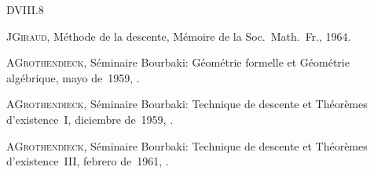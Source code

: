 \begin{sgabibliography}{D}{VIII.8}

 J\ptbl \textsc{Giraud}, Méthode de la descente, Mémoire 
de la Soc.\ Math.\ Fr., 1964.

 A\ptbl \textsc{Grothendieck}, Séminaire Bourbaki:
Géométrie formelle et Géométrie algébrique, mayo de~1959, .

 A\ptbl \textsc{Grothendieck}, Séminaire Bourbaki: Technique de
descente et Théorèmes d'existence~I, diciembre de~1959, .

 A\ptbl \textsc{Grothendieck}, Séminaire Bourbaki: Technique de
descente et Théorèmes d'existence~III, febrero de~1961, .
\end{sgabibliography}
